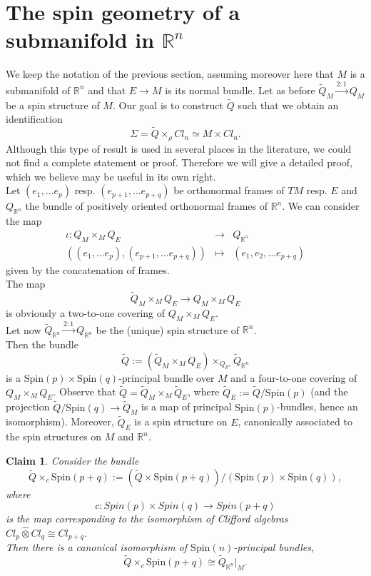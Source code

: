 \documentclass{amsart}
\newtheorem*{claim}{Claim}
\begin{document}
\section{The spin geometry of a submanifold in ${\mathbb{R}}^n$} 
We keep the notation of the previous section, assuming moreover here that $M$ is a submanifold of ${\mathbb{R}}^n$ and that $E\rightarrow M$ is its normal bundle. Let as before $\tilde{Q}_M\stackrel{2:1}{\rightarrow} Q_{M}$ be a spin structure of $M$. Our goal is to construct $\tilde Q$ such that we obtain an identification 
$$\Sigma=\tilde{Q}\times_{\rho} Cl_n\simeq M\times Cl_n.$$
Although this type of result is used in several places in the literature, we could not find a complete statement or proof. Therefore we will give a detailed proof, which we believe may be useful in its own right.\\
Let $(e_1, \dots e_p )$ resp. $(e_{p+1},\dots e_{p+q} )$ be orthonormal frames of $TM$ resp. $E$ and $Q_{{\mathbb{R}}^n}$ the bundle of positively oriented orthonormal frames of $\mathbb{R}^n$. We can consider the map 
\begin{eqnarray*}\iota:  Q_M\times_M Q_E&\rightarrow& Q_{\mathbb{R}^n}\\
((e_1, \dots e_p ), (e_{p+1},\dots e_{p+q} ))&\mapsto& (e_1,e_2,\dots e_{p+q})
\end{eqnarray*}
given by the concatenation of frames.\\
The map
$$\tilde{Q}_M\times_M Q_E\rightarrow Q_M\times_M Q_E$$
is obviously a two-to-one covering of $Q_M\times_M Q_E$.\\
Let now $\tilde{Q}_{\mathbb{R}^n}\stackrel{2:1}{\rightarrow} Q_{{\mathbb{R}}^n}$ be the (unique) spin structure of $\mathbb{R}^n$.\\ Then the bundle $$\tilde{Q}:=(\tilde{Q}_M\times_M Q_E)\times_{Q_{\mathbb{R}^n}}\tilde{Q}_{\mathbb{R}^n}$$ is a ${\mathrm{Spin}}(p)\times{\mathrm{Spin}}(q)$-principal bundle over $M$ and a four-to-one covering of $Q_M\times_M Q_E$.
Observe that $\tilde Q = \tilde Q_M \times_M \tilde Q_E$, where $\tilde Q_E := \tilde Q / {\mathrm{Spin}}(p)$ (and the projection $\tilde Q / {\mathrm{Spin}}(q) \to \tilde Q_M$ is a map of principal ${\mathrm{Spin}}(p)$-bundles, hence an isomorphism).  Moreover, $\tilde Q_E$ is a spin structure on $E$, canonically associated to the spin structures on $M$ and $\mathbb{R}^n$.
\begin{claim} Consider the bundle $$\tilde{Q}\times_{c}{\mathrm{Spin}}(p+q):=(\tilde{Q}\times{\mathrm{Spin}}(p+q))/({\mathrm{Spin}}(p)\times{\mathrm{Spin}}(q)),$$ where $$c:Spin(p)\times Spin(q)\rightarrow Spin(p+q)$$
is the map corresponding to the isomorphism of Clifford algebras
	$Cl_p \hat{\otimes} Cl_q \cong Cl_{p+q}$.\\
Then there is a canonical isomorphism of ${\mathrm{Spin}}(n)$-principal bundles, $$\tilde{Q}\times_{c}{\mathrm{Spin}}(p+q)\cong\tilde{Q}_{\mathbb{R}^n}|_M.$$
\end{claim}
\end{document}
